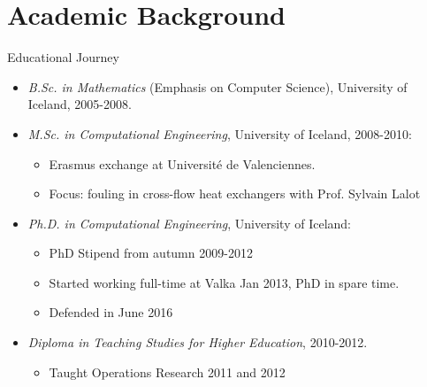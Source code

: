 \documentclass[
    NAME={Dr. Helga Ingimundardóttir},
    EMAIL={helgaingim@hi.is},
    FACULTY={Industrial Engineering},
    SUBTITLE={From Smart Algorithms in Fish Portioning to Pioneering Pipelines in Long-Range DNA Sequencing and Digital Travel},
    SEMINAR={IVT Faculty Gathering},
    DATE={September 6, 2023}
]{hi-latex/hi-beamer}
\begin{document}
\section{Academic Background}
\begin{frame}{Educational Journey}
\begin{itemize}
    \item \emph{B.Sc. in Mathematics} (Emphasis on Computer Science), University of Iceland, 2005-2008.
    \item \emph{M.Sc. in Computational Engineering}, University of Iceland, 2008-2010:
    \begin{itemize}
        \item Erasmus exchange at Université de Valenciennes.
        \item Focus: fouling in cross-flow heat exchangers with Prof. Sylvain Lalot
    \end{itemize}
    \item \emph{Ph.D. in Computational Engineering}, University of Iceland:
    \begin{itemize}
        \item PhD Stipend from autumn 2009-2012
        \item Started working full-time at Valka Jan 2013, PhD in spare time.
        \item Defended in June 2016
    \end{itemize}
    \item \emph{Diploma in Teaching Studies for Higher Education}, 2010-2012.
    \begin{itemize}
        \item Taught Operations Research 2011 and 2012
    \end{itemize}
\end{itemize}
\end{frame}
\end{document}
